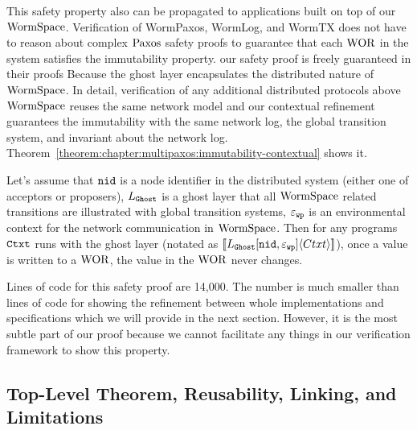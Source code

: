 This safety property also can be propagated to applications built on top of our $\mathrm{WormSpace}$.
Verification of WormPaxos, WormLog, and WormTX does not have to reason about complex 
$\mathrm{Paxos}$ safety proofs to guarantee that each $\mathrm{WOR}$ in the system satisfies the immutability property.
our safety proof is freely guaranteed in their proofs 
Because the ghost layer encapsulates the distributed nature of $\mathrm{WormSpace}$.
In detail, verification of any additional distributed protocols above $\mathrm{WormSpace}$ reuses 
the same network model and our contextual refinement guarantees the 
immutability with the same network log, the global transition system, and invariant about the network log.
Theorem~\ref{theorem:chapter:multipaxos:immutability-contextual} shows it.
\begin{theorem}
\label{theorem:chapter:multipaxos:immutability-contextual}
Let's assume that ${\mathrm{\texttt{nid}}}$ is a node identifier in the distributed system (either one of acceptors or proposers),
$L_{{\mathrm{\texttt{Ghost}}}}$ is a ghost layer that all $\mathrm{WormSpace}$ related transitions are illustrated with global transition systems, 
${\varepsilon}_{{\mathrm{\texttt{wp}}}}$ is an environmental context for the network communication in $\mathrm{WormSpace}$.
Then for any programs ${\mathrm{\texttt{Ctxt}}}$ runs with the ghost layer (notated as
$[\![{L_{{\mathrm{\texttt{Ghost}}}}[{\mathrm{\texttt{nid}}}, {\varepsilon}_{{\mathrm{\texttt{wp}}}}]} \langle {Ctxt} \rangle]\!]$),
once a value is written to a $\mathrm{WOR}$, the value in the $\mathrm{WOR}$ never changes.
 \end{theorem}
 
 Lines of code for this safety proof are 14,000. 
 The number is much smaller than lines of code for showing the refinement between whole implementations and specifications which we will provide in the next section.
 However, it is the most subtle part of our proof because we cannot facilitate any things in our verification framework to show this property.
 
\subsection{Top-Level Theorem, Reusability, Linking, and Limitations}
\label{chapter:multipaxos:top-level-theorem-reusability-linking-limitations}

